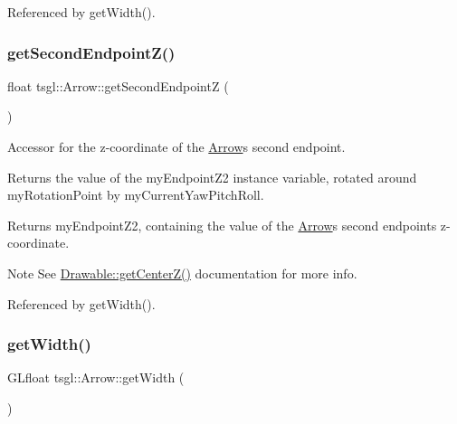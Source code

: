 Referenced by get\+Width().

\mbox{\label{classtsgl_1_1_arrow_adb3bf6b1bc75ab68bb89f5430358386a}} 
\subsubsection{\texorpdfstring{get\+Second\+Endpoint\+Z()}{getSecondEndpointZ()}}
{\footnotesize\ttfamily float tsgl\+::\+Arrow\+::get\+Second\+EndpointZ (\begin{DoxyParamCaption}{ }\end{DoxyParamCaption})}



Accessor for the z-\/coordinate of the \hyperlink{classtsgl_1_1_arrow}{Arrow}\textquotesingle{}s second endpoint. 

Returns the value of the my\+Endpoint\+Z2 instance variable, rotated around my\+Rotation\+Point by my\+Current\+Yaw\+Pitch\+Roll. \begin{DoxyReturn}{Returns}
my\+Endpoint\+Z2, containing the value of the \hyperlink{classtsgl_1_1_arrow}{Arrow}\textquotesingle{}s second endpoint\textquotesingle{}s z-\/coordinate. 
\end{DoxyReturn}
\begin{DoxyNote}{Note}
See \hyperlink{classtsgl_1_1_drawable_a6a6c0441d94ffebd149f88ae3ab87ced}{Drawable\+::get\+Center\+Z()} documentation for more info. 
\end{DoxyNote}


Referenced by get\+Width().

\mbox{\label{classtsgl_1_1_arrow_aac07322718ccdb64dfd847b300569142}} 
\subsubsection{\texorpdfstring{get\+Width()}{getWidth()}}
{\footnotesize\ttfamily G\+Lfloat tsgl\+::\+Arrow\+::get\+Width (\begin{DoxyParamCaption}{ }\end{DoxyParamCaption})\hspace{0.3cm}{\ttfamily [inline]}}



